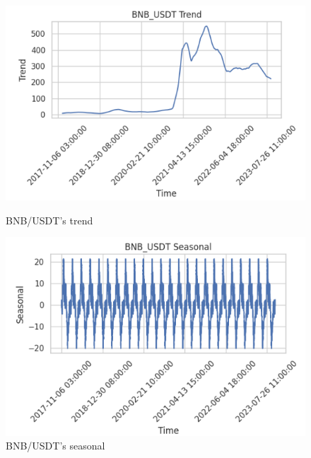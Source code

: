 \documentclass{ieeeojies}
\begin{document}
\begin{figure}[H]
    \centering
    \begin{minipage}{0.23\textwidth}
    \centering
    \includegraphics[width=1\textwidth]{bibliography/BNB_trend.png}
    \caption{BNB/USDT's trend}
    \label{fig:enter-label}
    \end{minipage}
    \hfill
    \begin{minipage}{0.23\textwidth}
    \centering
    \includegraphics[width=1\textwidth]{bibliography/BNB_seasonal.png}
    \caption{BNB/USDT's seasonal}
    \label{fig:enter-label}
    \end{minipage}
\end{figure}
\end{document}
